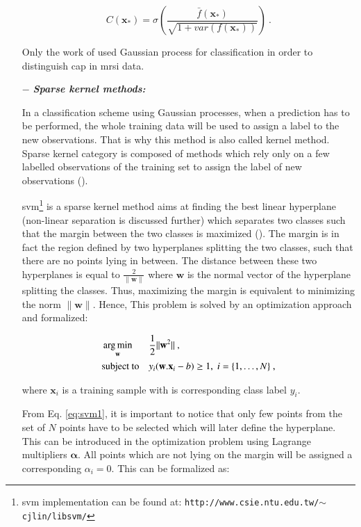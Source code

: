 \begin{enumerate}[leftmargin=*]
\begin{equation}
	C(\mathbf{x}_*) = \sigma\left( \frac{\bar{f}(\mathbf{x_*})}{\sqrt{1+var(f(\mathbf{x}_*))}} \right) \ .
	\label{eq:gp3}
\end{equation}

Only the work of \cite{Kelm2007} used Gaussian process for classification in order to distinguish \ac{cap} in \ac{mrsi} data.

\item[$-$] \textbf{\textit{Sparse kernel methods:}}

In a classification scheme using Gaussian processes, when a prediction has to be performed, the whole training data will be used to assign a label to the new observations. That is why this method is also called kernel method. Sparse kernel category is composed of methods which rely only on a few labelled observations of the training set to assign the label of new observations (\cite{Bishop2006}).

\Acf{svm}\footnote{\ac{svm} implementation can be found at: \texttt{http://www.csie.ntu.edu.tw/\allowbreak $\sim$cjlin/libsvm/}} is a sparse kernel method aims at finding the best linear hyperplane (non-linear separation is discussed further) which separates two classes such that the margin between the two classes is maximized (\cite{Vapnik1963}). The margin is in fact the region defined by two hyperplanes splitting the two classes, such that there are no points lying in between. The distance between these two hyperplanes is equal to $\frac{2}{\|\mathbf{w}\|}$ where $\mathbf{w}$ is the normal vector of the hyperplane splitting the classes. Thus, maximizing the margin is equivalent to minimizing the norm $\|\mathbf{w}\|$. Hence, This problem is solved by an optimization approach and formalized:

\begin{equation}
\begin{aligned}
& \operatorname*{arg\,min}_{\mathbf{w}}
& & \frac{1}{2} \| \mathbf{w}^2\| \ , \\
& \text{subject to}
& & y_i(\mathbf{w}.\mathbf{x}_i - b) \geq 1, \; i = \{ 1, \ldots, N \} \ ,
\end{aligned}
\label{eq:svm1}
\end{equation}

\noindent where $\mathbf{x}_i$ is a training sample with is corresponding class label $y_i$.

From Eq. \eqref{eq:svm1}, it is important to notice that only few points from the set of $N$ points have to be selected which will later define the hyperplane. This can be introduced in the optimization problem using Lagrange multipliers $\boldsymbol{\alpha}$. All points which are not lying on the margin will be assigned a corresponding $\alpha_i = 0$. This can be formalized as:


\end{enumerate}
